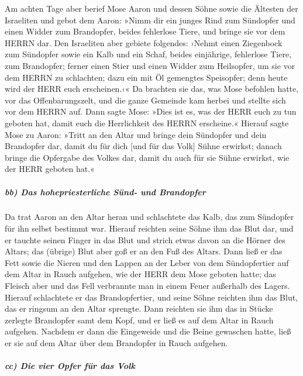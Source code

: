 Am achten Tage aber berief Mose Aaron und dessen Söhne
sowie die Ältesten der Israeliten und gebot dem Aaron:
»Nimm dir ein junges Rind zum Sündopfer und einen Widder zum Brandopfer,
beides fehlerlose Tiere, und bringe sie vor dem HERRN dar.
Den Israeliten aber gebiete folgendes: ›Nehmt einen
Ziegenbock zum Sündopfer sowie ein Kalb und ein Schaf, beides
einjährige, fehlerlose Tiere, zum Brandopfer; ferner einen
Stier und einen Widder zum Heilsopfer, um sie vor dem HERRN zu
schlachten; dazu ein mit Öl gemengtes Speisopfer; denn heute wird der
HERR euch erscheinen.‹« Da brachten sie das, was Mose
befohlen hatte, vor das Offenbarungszelt, und die ganze Gemeinde kam
herbei und stellte sich vor dem HERRN auf. Dann sagte
Mose: »Dies ist es, was der HERR euch zu tun geboten hat, damit euch die
Herrlichkeit des HERRN erscheine.« Hierauf sagte Mose zu
Aaron: »Tritt an den Altar und bringe dein Sündopfer und dein Brandopfer
dar, damit du für dich {[}und für das Volk{]} Sühne erwirkst; danach
bringe die Opfergabe des Volkes dar, damit du auch für sie Sühne
erwirkst, wie der HERR geboten hat.«

\hypertarget{bb-das-hohepriesterliche-suxfcnd--und-brandopfer}{%
\subparagraph{bb) Das hohepriesterliche Sünd- und
Brandopfer}\label{bb-das-hohepriesterliche-suxfcnd--und-brandopfer}}

Da trat Aaron an den Altar heran und schlachtete das Kalb,
das zum Sündopfer für ihn selbst bestimmt war. Hierauf
reichten seine Söhne ihm das Blut dar, und er tauchte seinen Finger in
das Blut und strich etwas davon an die Hörner des Altars; das (übrige)
Blut aber goß er an den Fuß des Altars. Dann ließ er das
Fett sowie die Nieren und den Lappen an der Leber von dem Sündopfertier
auf dem Altar in Rauch aufgehen, wie der HERR dem Mose geboten hatte;
das Fleisch aber und das Fell verbrannte man in einem
Feuer außerhalb des Lagers. Hierauf schlachtete er das
Brandopfertier, und seine Söhne reichten ihm das Blut, das er ringsum an
den Altar sprengte. Dann reichten sie ihm das in Stücke
zerlegte Brandopfer samt dem Kopf, und er ließ es auf dem Altar in Rauch
aufgehen. Nachdem er dann die Eingeweide und die Beine
gewaschen hatte, ließ er sie auf dem Altar über dem Brandopfer in Rauch
aufgehen.

\hypertarget{cc-die-vier-opfer-fuxfcr-das-volk}{%
\subparagraph{cc) Die vier Opfer für das
Volk}\label{cc-die-vier-opfer-fuxfcr-das-volk}}

